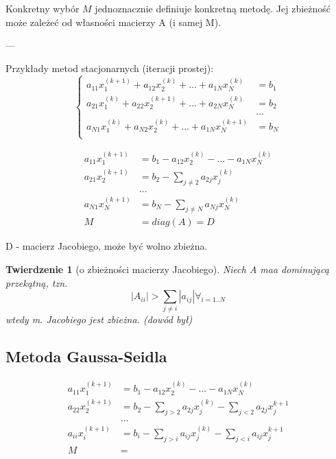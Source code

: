 \documentclass[hidelinks,a4paper,fleqn,oneside]{book}
\newtheorem{twierdz}{Twierdzenie}
\begin{document}
Konkretny wybór $M$ jednoznacznie definiuje konkretną metodę. Jej zbieżność może zależeć od własności macierzy A (i samej M).

---

Przykłady metod stacjonarnych (iteracji prostej):
\[
	\left\{ \begin{array}{ll}
	a_{11}x_1^{(k+1)} + a_{12}x_2^{(k)} + ... + a_{1N}x_N^{(k)} & = b_1 \\
	a_{21}x_1^{(k)} + a_{22}x_2^{(k+1)} + ... + a_{2N}x_N^{(k)} & = b_2 \\
	& ... \\
	a_{N1}x_1^{(k)} + a_{N2}x_2^{(k)} + ... + a_{1N}x_N^{(k+1)} & = b_N \\
	\end{array} \right.
\]

\[
	\begin{array}{ll}
		a_{11}x_1^{(k+1)} & = b_1 - a_{12}x_2^{(k)} - ... - a_{1N}x_N^{(k)} \\
		a_{21}x_2^{(k+1)} & = b_2 - \sum_{j\neq 2} a_{2j}x_j^{(k)}          \\
		                  & ...                                             \\
		a_{N1}x_N^{(k+1)} & = b_N - \sum_{j\neq N} a_{Nj}x_N^{(k)}          \\
		M                 & = diag(A) = D                                   
	\end{array}
\]

D - macierz Jacobiego, może być wolno zbieżna.

\begin{twierdz}[o zbieżności macierzy Jacobiego] Niech A maa dominującą przekątną, tzn.
	\[
		|A_{ii}| > \sum_{j \neq i}|a_{ij}| \forall_{i=1..N}
	\]
	wtedy m. Jacobiego jest zbieżna. (dowód był)	
\end{twierdz}
 

\subsection{Metoda Gaussa-Seidla} 
\[
	\begin{array}{ll}
		a_{11}x_1^{(k+1)} & = b_1 - a_{12}x_2^{(k)} - ... - a_{1N}x_N^{(k)}                     \\
		a_{22}x_2^{(k+1)} & = b_2 - \sum_{j > 2} a_{2j}x_j^{(k)} - \sum_{j < 2} a_{2j}x_j^{k+1} \\
		                  & ...                                                                 \\
		a_{ii}x_i^{(k+1)} & = b_i - \sum_{j > i} a_{ij}x_j^{(k)} - \sum_{j < i} a_{ij}x_j^{k+1} \\
		M                 & =                                                                   
	\end{array}
\]
 
\end{document}
